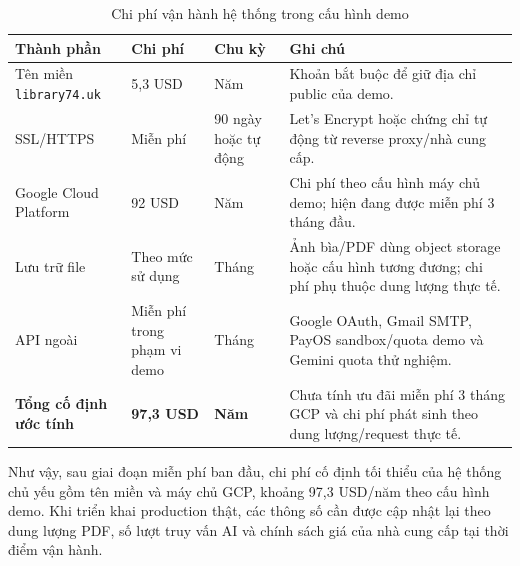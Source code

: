 \begin{table}[h]
\centering
\small
\caption{Chi phí vận hành hệ thống trong cấu hình demo}
\label{tab:hosting_cost}
\begin{tabularx}{\textwidth}{|p{3.5cm}|p{3.3cm}|p{2cm}|X|}
\hline
\textbf{Thành phần} & \textbf{Chi phí} & \textbf{Chu kỳ} & \textbf{Ghi chú} \\
\hline
Tên miền \texttt{library74.uk} & 5,3 USD & Năm & Khoản bắt buộc để giữ địa chỉ public của demo. \\
\hline
SSL/HTTPS & Miễn phí & 90 ngày hoặc tự động & Let's Encrypt hoặc chứng chỉ tự động từ reverse proxy/nhà cung cấp. \\
\hline
Google Cloud Platform & 92 USD & Năm & Chi phí theo cấu hình máy chủ demo; hiện đang được miễn phí 3 tháng đầu. \\
\hline
Lưu trữ file & Theo mức sử dụng & Tháng & Ảnh bìa/PDF dùng object storage hoặc cấu hình tương đương; chi phí phụ thuộc dung lượng thực tế. \\
\hline
API ngoài & Miễn phí trong phạm vi demo & Tháng & Google OAuth, Gmail SMTP, PayOS sandbox/quota demo và Gemini quota thử nghiệm. \\
\hline
\textbf{Tổng cố định ước tính} & \textbf{97,3 USD} & \textbf{Năm} & Chưa tính ưu đãi miễn phí 3 tháng GCP và chi phí phát sinh theo dung lượng/request thực tế. \\
\hline
\end{tabularx}
\end{table}

\noindent Như vậy, sau giai đoạn miễn phí ban đầu, chi phí cố định tối thiểu của
hệ thống chủ yếu gồm tên miền và máy chủ GCP, khoảng 97,3 USD/năm theo cấu hình
demo. Khi triển khai production thật, các thông số cần được cập nhật lại theo dung lượng PDF,
số lượt truy vấn AI và chính sách giá của nhà cung cấp tại thời điểm vận hành.
